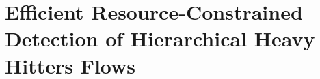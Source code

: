\chapter{Efficient Resource-Constrained Detection of Hierarchical Heavy Hitters Flows}
\label{cha:HHH}
%








% 
